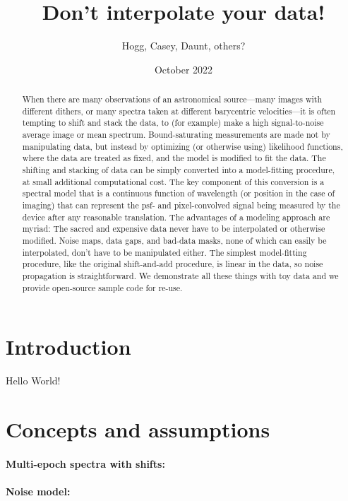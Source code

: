 \documentclass[11pt]{article}
\title{\bfseries%
Don't interpolate your data!}
\author{Hogg, Casey, Daunt, others?}
\date{October 2022}
\begin{document}
\maketitle

\begin{abstract}\noindent
When there are many observations of an astronomical source---many images with different dithers, or many spectra taken at different barycentric velocities---it is often tempting to shift and stack the data, to (for example) make a high signal-to-noise average image or mean spectrum.
Bound-saturating measurements are made not by manipulating data, but instead by optimizing (or otherwise using) likelihood functions, where the data are treated as fixed, and the model is modified to fit the data.
The shifting and stacking of data can be simply converted into a model-fitting procedure, at small additional computational cost.
The key component of this conversion is a spectral model that is a continuous function of wavelength (or position in the case of imaging) that can represent the psf- and pixel-convolved signal being measured by the device after any reasonable translation.
The advantages of a modeling approach are myriad:
The sacred and expensive data never have to be interpolated or otherwise modified.
Noise maps, data gaps, and bad-data masks, none of which can easily be interpolated, don't have to be manipulated either.
The simplest model-fitting procedure, like the original shift-and-add procedure, is linear in the data, so noise propagation is straightforward.
We demonstrate all these things with toy data and we provide open-source sample code for re-use.
\end{abstract}

\section{Introduction}

Hello World!

\section{Concepts and assumptions}

\paragraph{Multi-epoch spectra with shifts:}

\paragraph{Noise model:}
\end{document}
